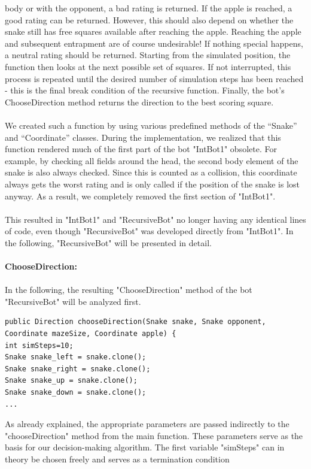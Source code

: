 \documentclass[a4paper,12pt]{article}
\begin{document}
body or with the opponent, a bad rating is returned. If the apple is reached, a good rating can be
returned. However, this should also depend on whether the snake still has free squares available
after reaching the apple. Reaching the apple and subsequent entrapment are of course undesirable!
If nothing special happens, a neutral rating should be returned. Starting from the simulated position,
the function then looks at the next possible set of squares. If not interrupted, this process is repeated
until the desired number of simulation steps has been reached - this is the final break condition of
the recursive function. Finally, the bot's ChooseDirection method returns the direction to the best
scoring square.\\
\\We created such a function by using various predefined methods of the “Snake” and “Coordinate”
classes. During the implementation, we realized that this function rendered much of the first part of
the bot "IntBot1" obsolete. For example, by checking all fields around the head, the second body
element of the snake is also always checked. Since this is counted as a collision, this coordinate
always gets the worst rating and is only called if the position of the snake is lost anyway. As a
result, we completely removed the first section of "IntBot1".\\
\\This resulted in "IntBot1" and "RecursiveBot" no longer having any identical lines of code, even
though "RecursiveBot" was developed directly from "IntBot1". In the following, "RecursiveBot"
will be presented in detail.\\
\\\textbf{ChooseDirection:}\\
\\In the following, the resulting "ChooseDirection" method of the bot "RecursiveBot" will be
analyzed first.
\begin{verbatim}
public Direction chooseDirection(Snake snake, Snake opponent, Coordinate mazeSize, Coordinate apple) {
int simSteps=10;
Snake snake_left = snake.clone();
Snake snake_right = snake.clone();
Snake snake_up = snake.clone();
Snake snake_down = snake.clone();
...
\end{verbatim}
As already explained, the appropriate parameters are passed indirectly to the "chooseDirection"
method from the main function. These parameters serve as the basis for our decision-making
algorithm.
The first variable "simSteps" can in theory be chosen freely and serves as a termination condition
\end{document}
